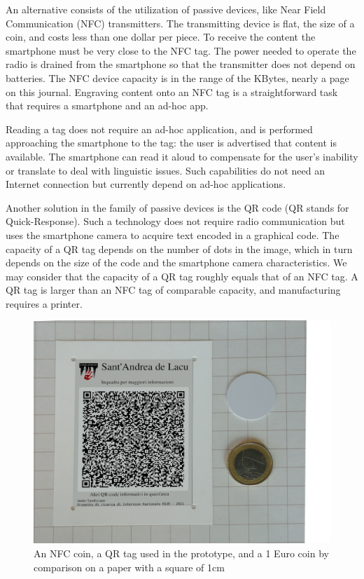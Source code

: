 \documentclass[sustainability,article,submit,pdftex,moreauthors]{Definitions/mdpi}
\begin{document}
An alternative consists of the utilization of passive devices, like Near Field Communication (NFC) transmitters. The transmitting device is flat, the size of a coin, and costs less than one dollar per piece. To receive the content the smartphone must be very close to the NFC tag. The power needed to operate the radio is drained from the smartphone so that the transmitter does not depend on batteries. The NFC device capacity is in the range of the KBytes, nearly a page on this journal. Engraving content onto an NFC tag is a straightforward task that requires a smartphone and an ad-hoc app.

Reading a tag does not require an ad-hoc application, and is performed approaching the smartphone to the tag: the user is advertised that content is available. The smartphone can read it aloud to compensate for the user's inability or translate to deal with linguistic issues. Such capabilities do not need an Internet connection but currently depend on ad-hoc applications.

Another solution in the family of passive devices is the QR code (QR stands for Quick-Response). Such a technology does not require radio communication but uses the smartphone camera to acquire text encoded in a graphical code. The capacity of a QR tag depends on the number of dots in the image, which in turn depends on the size of the code and the smartphone camera characteristics. We may consider that the capacity of a QR tag roughly equals that of an NFC tag. A QR tag is larger than an NFC tag of comparable capacity, and manufacturing requires a printer.

\begin{figure}
	\centering
	\includegraphics[width=0.9\linewidth]{figure/qr+NFC+coin}
	\caption[Passive devices dimensions]{An NFC coin, a QR tag used in the prototype, and a 1 Euro coin by comparison on a paper with a square of 1cm}
	\label{fig:qrnfccoin}
\end{figure}
\end{document}
